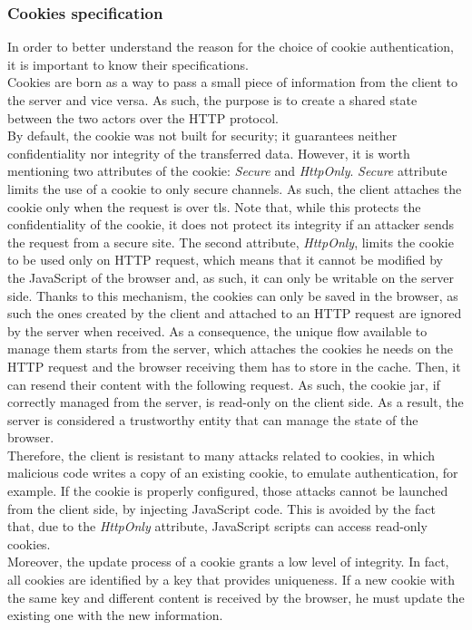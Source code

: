 \subsubsection{Cookies specification}
In order to better understand the reason for the choice of cookie authentication, it is important to know their specifications.
\\ Cookies are born as a way to pass a small piece of information from the client to the server and vice versa. As such, the purpose is to create a shared state between the two actors over the HTTP protocol. 
\\ By default, the cookie was not built for security; it guarantees neither confidentiality nor integrity of the transferred data. However, it is worth mentioning two attributes of the cookie: \textit{Secure} and \textit{HttpOnly}.  \textit{Secure} attribute limits the use of a cookie to only secure channels. As such, the client attaches the cookie only when the request is over \acrshort{tls}. Note that, while this protects the confidentiality of the cookie, it does not protect its integrity if an attacker sends the request from a secure site. The second attribute, \textit{HttpOnly}, limits the cookie to be used only on HTTP request, which means that it cannot be modified by the JavaScript of the browser and, as such, it can only be writable on the server side\cite{8392612}. Thanks to this mechanism, the cookies can only be saved in the browser, as such the ones created by the client and attached to an HTTP request are ignored by the server when received. As a consequence, the unique flow available to manage them starts from the server, which attaches the cookies he needs on the HTTP request and the browser receiving them has to store in the cache. Then, it can resend their content with the following request. As such, the cookie jar, if correctly managed from the server, is read-only on the client side. As a result, the server is considered a trustworthy entity that can manage the state of the browser. 
\\ Therefore, the client is resistant to many attacks related to cookies, in which malicious code writes a copy of an existing cookie, to emulate authentication, for example. If the cookie is properly configured, those attacks cannot be launched from the client side, by injecting JavaScript code. This is avoided by the fact that, due to the \textit{HttpOnly} attribute, JavaScript scripts can access read-only cookies.
\\ Moreover, the update process of a cookie grants a low level of integrity. In fact, all cookies are identified by a key that provides uniqueness. If a new cookie with the same key and different content is received by the browser, he must update the existing one with the new information. 
